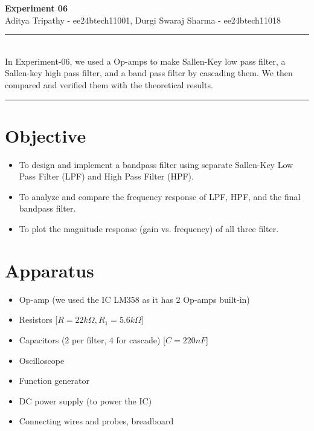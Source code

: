\documentclass[a4paper,12pt]{article}
\renewenvironment{abstract}
 {\par\noindent\textbf{\abstractname}\ \ignorespaces \\}
 {\par\noindent\medskip}
\begin{document}
\pagestyle{fancy}
\thispagestyle{empty}
\fancyhead[L]{}
\renewcommand*{\thefootnote}{\fnsymbol{footnote}}
\begin{center}
\Large{\textbf{Experiment 06}}
\vspace{0.4cm}
\normalsize
\\ Aditya Tripathy - ee24btech11001, Durgi Swaraj Sharma - ee24btech11018\\
\medskip
\normalsize
\end{center}
{\color{gray}\hrule}
\vspace{0.4cm}
\begin{abstract}
In Experiment-06, we used a Op-amps to make Sallen-Key low pass filter, a Sallen-key high pass filter, and a band pass filter by cascading them. We then compared and verified them with the theoretical results. 
\end{abstract}
{\color{gray}\hrule}
\medskip
\section{Objective}
\begin{itemize}
	\item To design and implement a bandpass filter using separate Sallen-Key Low Pass Filter (LPF) and High Pass Filter (HPF).
	\item To analyze and compare the frequency response of LPF, HPF, and the final bandpass filter.
	\item To plot the magnitude response (gain vs. frequency) of all three filter.
\end{itemize}
\section{Apparatus}
\begin{itemize}
	\item Op-amp (we used the IC LM358 as it has 2 Op-amps built-in)
	\item Resistors [$R = 22k\Omega, R_1 = 5.6k\Omega$]
	\item Capacitors (2 per filter, 4 for cascade) [$C = 220nF$]
	\item Oscilloscope
	\item Function generator
	\item DC power supply (to power the IC)
	\item Connecting wires and probes, breadboard
\end{itemize}
\end{document}

